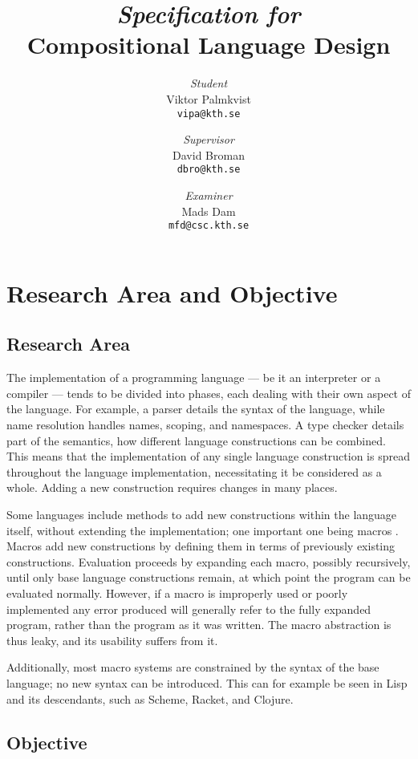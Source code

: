 \documentclass[10pt,a4paper]{article}
\title{{\normalsize \it Specification for}\\Compositional Language Design}
\author{{\normalsize \it Student}\\Viktor Palmkvist\\\texttt{vipa@kth.se}
\and {\normalsize \it Supervisor}\\David Broman\\\texttt{dbro@kth.se}
\and {\normalsize \it Examiner}\\Mads Dam\\\texttt{mfd@csc.kth.se}}
\begin{document}
\raggedright

\maketitle

\section{Research Area and Objective}

\subsection{Research Area}

The implementation of a programming language --- be it an interpreter or a compiler --- tends to be divided into phases, each dealing with their own aspect of the language. For example, a parser details the syntax of the language, while name resolution handles names, scoping, and namespaces. A type checker details part of the semantics, how different language constructions can be combined. This means that the implementation of any single language construction is spread throughout the language implementation, necessitating it be considered as a whole. Adding a new construction requires changes in many places.

Some languages include methods to add new constructions within the language itself, without extending the implementation; one important one being macros \cite{plt-tr1,Hickey2008,Matsakis2014}. Macros add new constructions by defining them in terms of previously existing constructions. Evaluation proceeds by expanding each macro, possibly recursively, until only base language constructions remain, at which point the program can be evaluated normally. However, if a macro is improperly used or poorly implemented any error produced will generally refer to the fully expanded program, rather than the program as it was written. The macro abstraction is thus leaky, and its usability suffers from it.

Additionally, most macro systems are constrained by the syntax of the base language; no new syntax can be introduced. This can for example be seen in Lisp and its descendants, such as Scheme, Racket, and Clojure.

\subsection{Objective}
\end{document}
